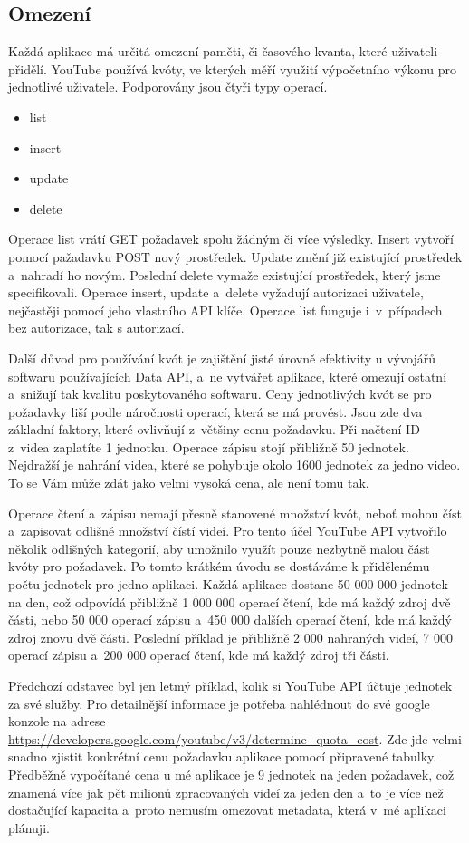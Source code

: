\subsection{Omezení}
\par Každá aplikace má určitá omezení paměti, či časového kvanta, které uživateli přidělí. YouTube používá kvóty, ve kterých měří využití výpočetního výkonu pro jednotlivé uživatele. Podporovány jsou čtyři typy operací.
\begin{itemize}
\item {list}
\item {insert}
\item {update}
\item {delete}
\end{itemize}
Operace list vrátí GET požadavek spolu žádným či více výsledky. Insert vytvoří pomocí pažadavku POST nový prostředek. Update změní již existující prostředek a~nahradí ho novým. Poslední delete vymaže existující prostředek, který jsme specifikovali. Operace insert, update a~delete vyžadují autorizaci uživatele, nejčastěji pomocí jeho vlastního API klíče. Operace list funguje i~v~případech bez autorizace, tak s autorizací.
\par Další důvod pro používání kvót je zajištění jisté úrovně efektivity u vývojářů softwaru používajících Data API, a~ne vytvářet aplikace, které omezují ostatní a~snižují tak kvalitu poskytovaného softwaru. Ceny jednotlivých kvót se pro požadavky liší podle náročnosti operací, která se má provést. Jsou zde dva základní faktory, které ovlivňují z~většiny cenu požadavku. Při načtení ID z~videa zaplatíte 1 jednotku. Operace zápisu stojí přibližně 50 jednotek. Nejdražší je nahrání videa, které se pohybuje okolo 1600 jednotek za jedno video. To se Vám může zdát jako velmi vysoká cena, ale není tomu tak. 
\par Operace čtení a~zápisu nemají přesně stanovené množství kvót, neboť mohou číst a~zapisovat odlišné množství čístí videí. Pro tento účel YouTube API vytvořilo několik odlišných kategorií, aby umožnilo využít pouze nezbytně malou část kvóty pro požadavek. Po tomto krátkém úvodu se dostáváme k přidělenému počtu jednotek pro jedno aplikaci. Každá aplikace dostane 50 000 000 jednotek na den, což odpovídá přibližně 1 000 000 operací čtení, kde má každý zdroj dvě části, nebo 50 000 operací zápisu a~450 000 dalších operací čtení, kde má každý zdroj znovu dvě části. Poslední příklad je přibližně 2 000 nahraných videí, 7 000 operací zápisu a~200 000 operací čtení, kde má každý zdroj tři části.
\par Předchozí odstavec byl jen letmý příklad, kolik si YouTube API účtuje jednotek za své služby. Pro detailnější informace je potřeba nahlédnout do své google konzole na adrese \url{https://developers.google.com/youtube/v3/determine_quota_cost}. Zde jde velmi snadno zjistit konkrétní cenu požadavku aplikace pomocí připravené tabulky. Předběžně vypočítané cena u mé aplikace je 9 jednotek na jeden požadavek, což znamená více jak pět milionů zpracovaných videí za jeden den a~to je více než dostačující kapacita a~proto nemusím omezovat metadata, která v~mé aplikaci plánuji. 


%

